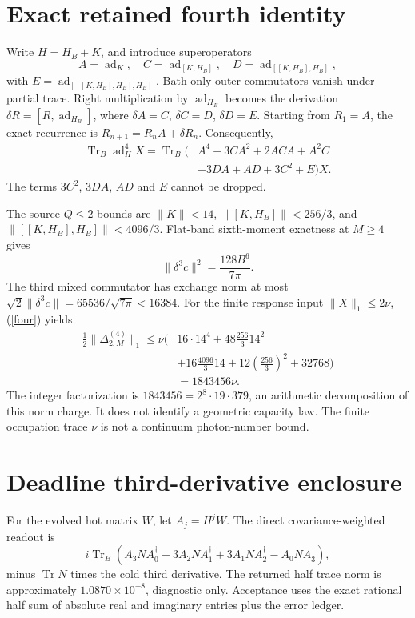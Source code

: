 \documentclass[a4paper,journal]{IEEEtran}
\newcommand{\Tr}{\operatorname{Tr}}\newcommand{\ad}{\operatorname{ad}}
\begin{document}
\section{Exact retained fourth identity}
Write $H=H_B+K$, and introduce superoperators
\begin{equation}A=\ad_K,\quad C=\ad_{[K,H_B]},\quad D=\ad_{[[K,H_B],H_B]},\end{equation}
with $E=\ad_{[[[K,H_B],H_B],H_B]}$. Bath-only outer commutators vanish under partial trace. Right multiplication by $\ad_{H_B}$ becomes the derivation $\delta R=[R,\ad_{H_B}]$, where $\delta A=C$, $\delta C=D$, $\delta D=E$. Starting from $R_1=A$, the exact recurrence is $R_{n+1}=R_nA+\delta R_n$. Consequently,
\begin{align}
\Tr_B\ad_H^4X=\Tr_B\big(&A^4+3CA^2+2ACA+A^2C\nonumber\\&+3DA+AD+3C^2+E\big)X.\label{four}
\end{align}
The terms $3C^2$, $3DA$, $AD$ and $E$ cannot be dropped.

The source $Q\le2$ bounds are $\|K\|<14$, $\|[K,H_B]\|<256/3$, and $\|[[K,H_B],H_B]\|<4096/3$. Flat-band sixth-moment exactness at $M\ge4$ gives
\begin{equation}\|\delta^3c\|^2=\frac{128B^6}{7\pi}.
\end{equation}
The third mixed commutator has exchange norm at most $\sqrt2\|\delta^3c\|=65536/\sqrt{7\pi}<16384$. For the finite response input $\|X\|_1\le2\nu$, (\ref{four}) yields
\begin{align}
\tfrac12\|\Delta_{2,M}^{(4)}\|_1\le\nu\big(&16\cdot14^4+48\tfrac{256}{3}14^2\nonumber\\&+16\tfrac{4096}{3}14+12(\tfrac{256}{3})^2+32768\big)\nonumber\\
&=1843456\nu.\label{jfour}
\end{align}
The integer factorization is $1843456=2^8\cdot19\cdot379$, an arithmetic decomposition of this norm charge. It does not identify a geometric capacity law. The finite occupation trace $\nu$ is not a continuum photon-number bound.
\section{Deadline third-derivative enclosure}
For the evolved hot matrix $W$, let $A_j=H^jW$. The direct covariance-weighted readout is
\begin{equation}i\Tr_B(A_3NA_0^\dagger-3A_2NA_1^\dagger+3A_1NA_2^\dagger-A_0NA_3^\dagger),
\end{equation}
minus $\Tr N$ times the cold third derivative. The returned half trace norm is approximately $1.0870\times10^{-8}$, diagnostic only. Acceptance uses the exact rational half sum of absolute real and imaginary entries plus the error ledger.
\end{document}
